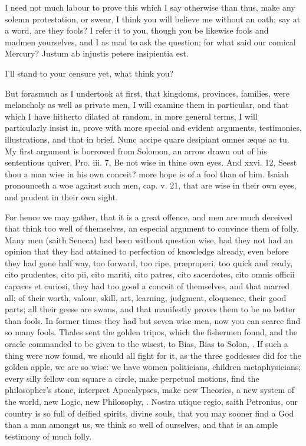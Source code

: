 {I need not much labour to prove this which I say otherwise than thus,
make any solemn protestation, or swear, I think you will believe me
without an oath; say at a word, are they fools? I refer it to you,
though you be likewise fools and madmen yourselves, and I as mad to ask
the question; for what said our comical Mercury?
Justum ab injustis petere insipientia est.

I'll stand to your censure yet, what think you?

But forasmuch as I undertook at first, that kingdoms, provinces,
families, were melancholy as well as private men, I will examine them
in particular, and that which I have hitherto dilated at random, in
more general terms, I will particularly insist in, prove with more
special and evident arguments, testimonies, illustrations, and that in
brief. Nunc accipe quare desipiant omnes \ae{}que ac tu. My first
argument is borrowed from Solomon, an arrow drawn out of his
sententious quiver, Pro. iii. 7, Be not wise in thine own eyes. And
xxvi. 12, Seest thou a man wise in his own conceit? more hope is of a
fool than of him. Isaiah pronounceth a woe against such men, cap. v.
21, that are wise in their own eyes, and prudent in their own sight.

For hence we may gather, that it is a great offence, and men are much
deceived that think too well of themselves, an especial argument to
convince them of folly. Many men (saith Seneca) had been without
question wise, had they not had an opinion that they had attained to
perfection of knowledge already, even before they had gone half way,
too forward, too ripe, pr\ae{}properi, too quick and ready, cito
prudentes, cito pii, cito mariti, cito patres, cito sacerdotes, cito
omnis officii capaces et curiosi, they had too good a conceit of
themselves, and that marred all; of their worth, valour, skill, art,
learning, judgment, eloquence, their good parts; all their geese are
swans, and that manifestly proves them to be no better than fools. In
former times they had but seven wise men, now you can scarce find so
many fools. Thales sent the golden tripos, which the fishermen found,
and the oracle commanded to be  given to the wisest, to Bias, Bias
to Solon, \etc{}. If such a thing were now found, we should all fight for
it, as the three goddesses did for the golden apple, we are so wise: we
have women politicians, children metaphysicians; every silly fellow can
square a circle, make perpetual motions, find the philosopher's stone,
interpret Apocalypses, make new Theories, a new system of the world,
new Logic, new Philosophy, \etc{}. Nostra utique regio, saith
Petronius, our country is so full of deified spirits, divine
souls, that you may sooner find a God than a man amongst us, we think
so well of ourselves, and that is an ample testimony of much folly.

}
